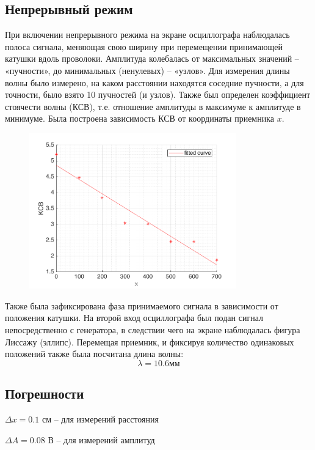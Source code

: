 \subsection{Непрерывный режим}
При включении непрерывного режима на экране осциллографа наблюдалась полоса сигнала, меняющая свою ширину при перемещении принимающей катушки вдоль проволоки. Амплитуда колебалась от максимальных значений – «пучности», до минимальных (ненулевых) – «узлов». Для измерения длины волны было измерено, на каком расстоянии находятся соседние пучности, а для точности, было взято 10 пучностей (и узлов).
Также был определен коэффициент стоячести волны (КСВ), т.е. отношение амплитуды в максимуме к амплитуде в минимуме. Была построена зависимость КСВ от координаты приемника $x$.
\begin{figure}[H]
	\centering
	\includegraphics[width=0.8\textwidth]{plot.png}
	\caption{}
	\label{fig:1}
\end{figure}

Также была зафиксирована фаза принимаемого сигнала в зависимости от положения катушки. На второй вход осциллографа был подан сигнал непосредственно с генератора, в следствии чего на экране наблюдалась фигура Лиссажу (эллипс). Перемещая приемник, и фиксируя количество одинаковых положений также была посчитана длина волны:
\begin{equation}
	\lambda=10.6 \text{мм}
\end{equation}


\subsection{Погрешности}
$\Delta x=0.1$ см -- для измерений расстояния

$\Delta A=0.08$ В -- для измерений амплитуд
 